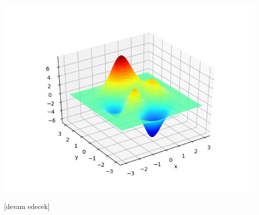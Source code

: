 \documentclass[12pt,fleqn]{article}\usepackage{../../common}
\begin{document}
\includegraphics[width=35 em]{func_70_dfo_02.png}




[devam edecek]
\end{document}
